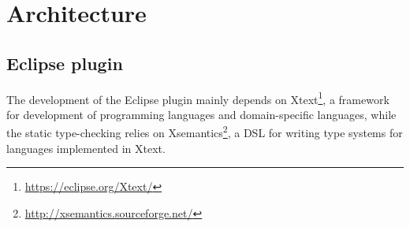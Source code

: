 \section{Architecture}



\subsection{Eclipse plugin}
The development of the Eclipse plugin mainly depends on Xtext\footnote{\url{https://eclipse.org/Xtext/}}, a framework for 
development of programming languages and domain-specific languages, while
the static type-checking relies on Xsemantics\footnote{\url{http://xsemantics.sourceforge.net/}}, a DSL for writing type systems for languages implemented in Xtext.